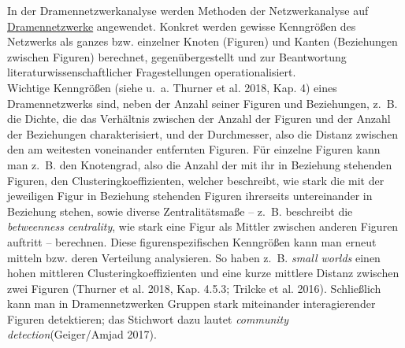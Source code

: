 \documentclass{article}
\begin{document}
    In der Dramennetzwerkanalyse werden Methoden der Netzwerkanalyse auf \href{http://gams.uni-graz.at/o:konde.73}{Dramennetzwerke} angewendet. Konkret
                  werden gewisse Kenngrößen des Netzwerks als ganzes bzw. einzelner Knoten
                  (Figuren) und Kanten (Beziehungen zwischen Figuren) berechnet, gegenübergestellt
                  und zur Beantwortung literaturwissenschaftlicher Fragestellungen
                  operationalisiert.\\
            
        Wichtige Kenngrößen (siehe u. a. Thurner et al. 2018, Kap. 4) eines
                  Dramennetzwerks sind, neben der Anzahl seiner Figuren und Beziehungen, z. B. die
                  Dichte, die das Verhältnis zwischen der Anzahl der Figuren und der Anzahl der
                  Beziehungen charakterisiert, und der Durchmesser, also die Distanz zwischen den am
                  weitesten voneinander entfernten Figuren. Für einzelne Figuren kann man z. B. den
                  Knotengrad, also die Anzahl der mit ihr in Beziehung stehenden Figuren, den
                  Clusteringkoeffizienten, welcher beschreibt, wie stark die mit der jeweiligen
                  Figur in Beziehung stehenden Figuren ihrerseits untereinander in Beziehung stehen,
                  sowie diverse Zentralitätsmaße – z. B. beschreibt die \emph{betweenness centrality}, wie stark eine Figur als Mittler zwischen anderen
                  Figuren auftritt – berechnen. Diese figurenspezifischen Kenngrößen kann man erneut
                  mitteln bzw. deren Verteilung analysieren. So haben z. B. \emph{small
                     worlds} einen hohen mittleren Clusteringkoeffizienten und eine kurze
                  mittlere Distanz zwischen zwei Figuren (Thurner et al. 2018, Kap. 4.5.3;
                     Trilcke et al. 2016). Schließlich kann man in Dramennetzwerken Gruppen
                  stark miteinander interagierender Figuren detektieren; das Stichwort dazu lautet
                     \emph{community detection}(Geiger/Amjad 2017).\\
            
\end{document}

